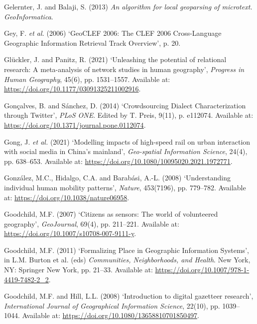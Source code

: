 \documentclass[
  letterpaper,
  11pt,
  english,
  onehalfspacing,
  headsepline]{MastersDoctoralThesis}
\newlength{\cslhangindent}
\newlength{\cslentryspacingunit} %
\newenvironment{CSLReferences}[2] %
 {%
  \setlength{\parindent}{0pt}
  \ifodd #1
  \let\oldpar\par
  \def\par{\hangindent=\cslhangindent\oldpar}
  \fi
  \setlength{\parskip}{#2\cslentryspacingunit}
 }%
 {}
\begin{document}
\begin{CSLReferences}{0}{0}
\leavevmode{}%
Gelernter, J. and Balaji, S. (2013) \emph{An algorithm for local
geoparsing of microtext. {GeoInformatica}}.

\leavevmode{}%
Gey, F. \emph{et al.} (2006) {`{GeoCLEF} 2006: The {CLEF} 2006
{Cross-Language Geographic Information Retrieval Track Overview}'}, p.
20.

\leavevmode{}%
Glückler, J. and Panitz, R. (2021) {`Unleashing the potential of
relational research: {A} meta-analysis of network studies in human
geography'}, \emph{Progress in Human Geography}, 45(6), pp. 1531--1557.
Available at: \url{https://doi.org/10.1177/03091325211002916}.

\leavevmode{}%
Gonçalves, B. and Sánchez, D. (2014) {`Crowdsourcing {Dialect
Characterization} through {Twitter}'}, \emph{PLoS ONE}. Edited by T.
Preis, 9(11), p. e112074. Available at:
\url{https://doi.org/10.1371/journal.pone.0112074}.

\leavevmode{}%
Gong, J. \emph{et al.} (2021) {`Modelling impacts of high-speed rail on
urban interaction with social media in {China}'s mainland'},
\emph{Geo-spatial Information Science}, 24(4), pp. 638--653. Available
at: \url{https://doi.org/10.1080/10095020.2021.1972771}.

\leavevmode{}%
González, M.C., Hidalgo, C.A. and Barabási, A.-L. (2008) {`Understanding
individual human mobility patterns'}, \emph{Nature}, 453(7196), pp.
779--782. Available at: \url{https://doi.org/10.1038/nature06958}.

\leavevmode{}%
Goodchild, M.F. (2007) {`Citizens as sensors: The world of volunteered
geography'}, \emph{GeoJournal}, 69(4), pp. 211--221. Available at:
\url{https://doi.org/10.1007/s10708-007-9111-y}.

\leavevmode{}%
Goodchild, M.F. (2011) {`Formalizing {Place} in {Geographic Information
Systems}'}, in L.M. Burton et al. (eds) \emph{Communities,
{Neighborhoods}, and {Health}}. {New York, NY}: {Springer New York}, pp.
21--33. Available at: \url{https://doi.org/10.1007/978-1-4419-7482-2_2}.

\leavevmode{}%
Goodchild, M.F. and Hill, L.L. (2008) {`Introduction to digital
gazetteer research'}, \emph{International Journal of Geographical
Information Science}, 22(10), pp. 1039--1044. Available at:
\url{https://doi.org/10.1080/13658810701850497}.


\end{CSLReferences}
\end{document}
